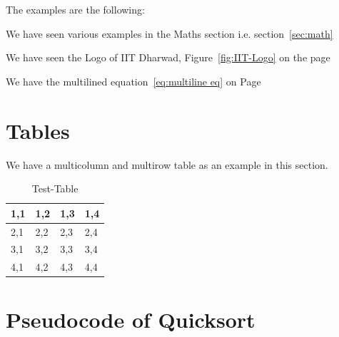 \documentclass{article}
\begin{document}
The examples are the following:
\hfill

We have seen various examples in the Maths section i.e. section~\ref{sec:math}

We have seen the Logo of IIT Dharwad, Figure~\ref{fig:IIT-Logo} on the page~\pageref{fig:IIT-Logo}

We have the multilined equation~\ref{eq:multiline eq} on Page~\pageref{eq:multiline eq}

\section{Tables}

We have a multicolumn and multirow table as an example in this section.


\begin{table}[h]
    \centering
    \begin{tabular}{||p{2cm} |p{2cm} |p{2cm} |p{2cm} ||}
    \hline
     1,1 & 1,2 & 1,3 & 1,4  \\
     \hline
     \hline
     2,1 & 2,2 & 2,3 & 2,4 \\
     \hline
     3,1 & 3,2 & 3,3 & 3,4 \\
     \hline
     4,1 & 4,2 & 4,3 & 4,4 \\
     \hline 
\end{tabular}
    \caption{Test-Table}
    \label{tab:Test-Table}
\end{table}

\newpage

\section{Pseudocode of Quicksort}
\end{document}
